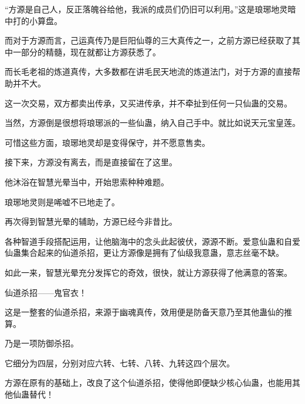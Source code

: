 \begin{this_body}
“方源是自己人，反正落魄谷给他，我派的成员们仍旧可以利用。”这是琅琊地灵暗中打的小算盘。

而对于方源而言，己运真传乃是巨阳仙尊的三大真传之一，之前方源已经获取了其中一部分的精髓，现在就都让方源获悉了。

而长毛老祖的炼道真传，大多数都在讲毛民天地流的炼道法门，对于方源的直接帮助并不大。

这一次交易，双方都卖出传承，又买进传承，并不牵扯到任何一只仙蛊的交易。

当然，方源倒是很想将琅琊派的一些仙蛊，纳入自己手中。就比如说天元宝皇莲。

可惜这些方面，琅琊地灵却是变得保守，并不愿意售卖。

接下来，方源没有离去，而是直接留在了这里。

他沐浴在智慧光晕当中，开始思索种种难题。

琅琊地灵则是唏嘘不已地走了。

再次得到智慧光晕的辅助，方源已经今非昔比。

各种智道手段搭配运用，让他脑海中的念头此起彼伏，源源不断。爱意仙蛊和自爱仙蛊集合起来的仙道杀招，更让方源像是拥有了仙级我意蛊，意志丝毫不缺。

如此一来，智慧光晕充分发挥它的奇效，很快，就让方源获得了他满意的答案。

仙道杀招——鬼官衣！

这是一整套的仙道杀招，来源于幽魂真传，效用便是防备天意乃至其他蛊仙的推算。

乃是一项防御杀招。

它细分为四层，分别对应六转、七转、八转、九转这四个层次。

方源在原有的基础上，改良了这个仙道杀招，使得他即便缺少核心仙蛊，也能用其他仙蛊替代！

\end{this_body}

